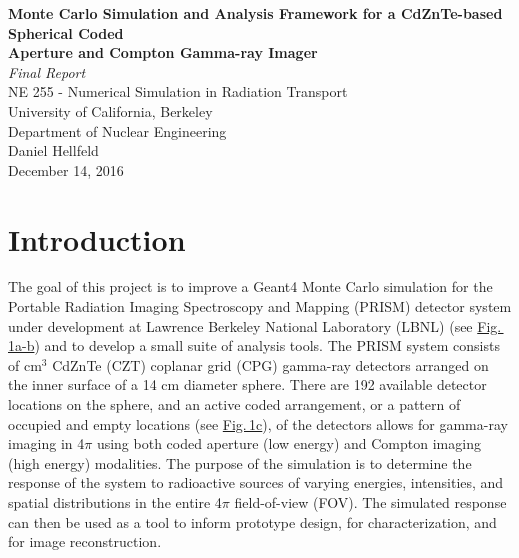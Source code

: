 \documentclass[10pt]{article}
\begin{document}
\begin{centering}
\textbf{Monte Carlo Simulation and Analysis Framework for a CdZnTe-based Spherical Coded\\[-5pt] Aperture and Compton Gamma-ray Imager}\\
\vspace{5pt}
\emph{Final Report}\\
\vspace{5pt}
NE 255 - Numerical Simulation in Radiation Transport \\[-5pt]
University of California, Berkeley \\[-5pt]
Department of Nuclear Engineering\\
\vspace{5pt}
Daniel Hellfeld\\
\vspace{5pt}
December 14, 2016 \\
\end{centering}


\section{Introduction}

The goal of this project is to improve a Geant4 \cite{Agostinelli2003} Monte Carlo simulation for the Portable Radiation Imaging Spectroscopy and Mapping (PRISM) detector system under development at Lawrence Berkeley National Laboratory (LBNL) (see \hyperlink{fig1}{Fig.\,1a-b}) and to develop a small suite of analysis tools. The PRISM system consists of cm$^3$ CdZnTe (CZT) coplanar grid (CPG) gamma-ray detectors arranged on the inner surface of a 14 cm diameter sphere. There are 192 available detector locations on the sphere, and an active coded arrangement, or a pattern of occupied and empty locations (see \hyperlink{fig1}{Fig.\,1c}), of the detectors allows for gamma-ray imaging in 4$\pi$ using both coded aperture (low energy) and Compton imaging (high energy) modalities. The purpose of the simulation is to determine the response of the system to radioactive sources of varying energies, intensities, and spatial distributions in the entire 4$\pi$ field-of-view (FOV). The simulated response can then be used as a tool to inform prototype design, for characterization, and for image reconstruction. 
\end{document}

